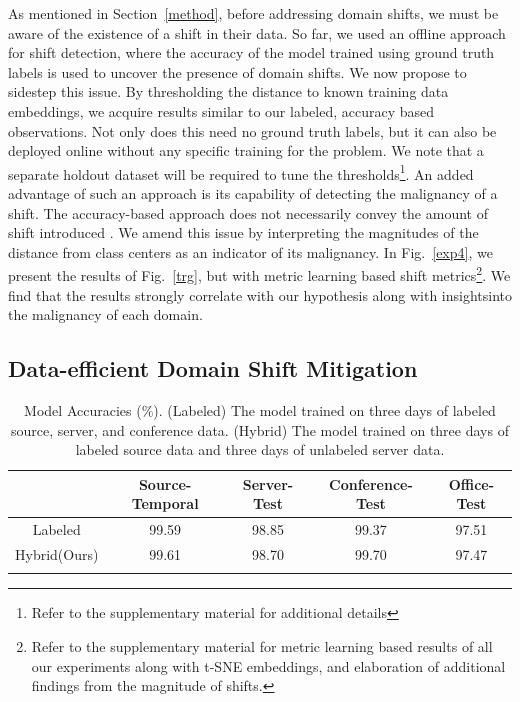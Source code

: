 \documentclass{article}
\begin{document}
As mentioned in Section~\ref{method}, before addressing domain shifts, we must be aware of the existence of a shift in their data. So far, we used an offline approach for shift detection, where the accuracy of the model trained using ground truth labels is used to uncover the presence of domain shifts. We now propose to sidestep this issue. By thresholding the distance to known training data embeddings, we acquire results similar to our labeled, accuracy based observations. Not only does this need no ground truth labels, but it can also be deployed online without any specific training for the problem. We note that a separate holdout dataset will be required to tune the thresholds\footnote{Refer to the supplementary material for additional details}. An added advantage of such an approach is its capability of detecting the malignancy of a shift. The accuracy-based approach does not necessarily convey the amount of shift introduced \cite{gal2016dropout, snoek2019can}. We amend this issue by interpreting the magnitudes of the distance from class centers as an indicator of its malignancy. In Fig.~\ref{exp4}, we present the results of Fig.~\ref{trg}, but with metric learning based shift metrics\footnote{Refer to the supplementary material for metric learning based results of all our experiments along with t-SNE embeddings, and elaboration of additional findings from the magnitude of shifts.}. We find that the results strongly correlate with our hypothesis along with insights\footnotemark[\value{footnote}] into the malignancy of each domain. 

\subsection{Data-efficient Domain Shift Mitigation}

\begin{table}[ht]
\caption{Model Accuracies (\%). (Labeled) The model trained on three days of labeled source, server, and conference data. (Hybrid) The model trained on three days of labeled source data and three days of unlabeled server data.}
\begin{center}
\begin{tabular}{ccccc} 
\hline
  & Source-Temporal & Server-Test & Conference-Test  & Office-Test \\
\hline
 Labeled & 99.59 & 98.85 & 99.37 & 97.51 \\ 
\hline
 Hybrid(Ours) & 99.61 & 98.70 & 99.70 & 97.47 \\ 
\hline
\label{uda}
\end{tabular}
\end{center}
\end{table}
\end{document}

